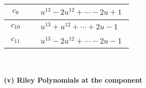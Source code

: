 \documentclass[1p]{elsarticle_modified}
\theoremstyle{definition}
\begin{document}
\begin{tabular}{m{50pt}|m{274pt}}
\hline $$\begin{aligned}c_{9}\end{aligned}$$&$\begin{aligned}
&u^{13}-2 u^{12}+\cdots-2 u+1
\end{aligned}$\\
\hline $$\begin{aligned}c_{10}\end{aligned}$$&$\begin{aligned}
&u^{13}+u^{12}+\cdots+2 u-1
\end{aligned}$\\
\hline $$\begin{aligned}c_{11}\end{aligned}$$&$\begin{aligned}
&u^{13}-2 u^{12}+\cdots-2 u-1
\end{aligned}$\\
\hline
\end{tabular}\\~\\
\newpage\renewcommand{\arraystretch}{1}
\flushleft \textbf{(v) Riley Polynomials at the component}\newline \\
\end{document}

